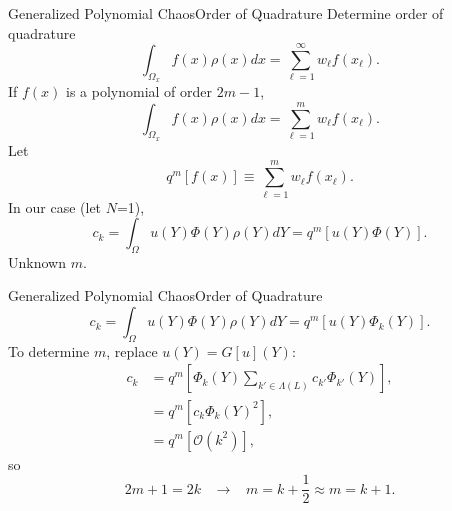 \documentclass{beamer}
\begin{document}
\begin{frame}{Generalized Polynomial Chaos}{Order of Quadrature}%
  Determine order of quadrature
  \begin{equation*}
    \int_{\Omega_x} f(x)\rho(x)dx = \sum_{\ell=1}^\infty w_\ell f(x_\ell).
  \end{equation*}
  If $f(x)$ is a polynomial of order $2m-1$,
  \begin{equation*}
    \int_{\Omega_x} f(x)\rho(x)dx = \sum_{\ell=1}^m w_\ell f(x_\ell).
  \end{equation*}
  Let
  \begin{equation*}
    q^{m}[f(x)] \equiv \sum_{\ell=1}^m w_\ell f(x_\ell).
  \end{equation*}
  In our case (let $N$=1),
  \begin{equation*}
    c_k = \int_{\Omega} u(Y)\Phi(Y)\rho(Y)dY = q^m[u(Y)\Phi(Y)].
  \end{equation*}
  Unknown $m$.
\end{frame}

\begin{frame}{Generalized Polynomial Chaos}{Order of Quadrature}\vspace{-20pt}
  \begin{equation*}
    c_k = \int_{\Omega} u(Y)\Phi(Y)\rho(Y)dY = q^m[u(Y)\Phi_k(Y)].
  \end{equation*}
  To determine $m$, replace $u(Y)=G[u](Y)$:
  \begin{align*}
    c_k &= q^m\left[\Phi_k(Y)\sum_{k'\in\Lambda(L)}c_{k'}\Phi_{k'}(Y)\right], \\
        &= q^m\left[c_k\Phi_k(Y)^2\right],\\
        &= q^m\left[\mathcal{O}(k^2)\right],
  \end{align*}
  so
  \begin{equation*}
    2m+1 = 2k \hspace{10pt}\to\hspace{10pt}m=k+\frac{1}{2}\approx m=k+1.
  \end{equation*}
\end{frame}
\end{document}
